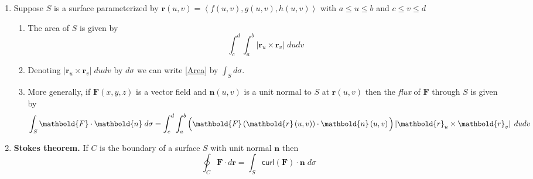 \documentclass[12pt]{article}
\begin{document}
\begin{enumerate}
\item Suppose $S$ is a surface parameterized by
$\mathbold{r}\left(u,v\right)
=\left\langle f\left(u,v\right),g\left(u,v\right),h\left(u,v\right)
\right\rangle$ with $a\le u\le b$ and $c\le v\le d$
\begin{enumerate}
\item The area of $S$ is given by
\begin{equation}\label{Area}
\int_c^d\int_a^b\left|\mathbold{r}_u\times\mathbold{r}_v
\right|\;dudv
\end{equation}
\item Denoting $\left|\mathbold{r}_u\times\mathbold{r}_v\right|\;dudv$
by $d\sigma$ we can write \autoref{Area} by
$\int_Sd\sigma$.
\item More generally, if $\mathbold{F}\left(x,y,z\right)$
is a vector field and $\mathbold{n}\left(u,v\right)$
is a unit normal to $S$ at $\mathbold{r}\left(u,v\right)$
then the {\em flux} of $\mathbold{F}$ through $S$
is given by
\[\int_S\mathbold{F}\cdot\mathbold{n}\;d\sigma
=\int_c^d\int_a^b\left(
\mathbold{F}\left(\mathbold{r}\left(u,v\right)\right)
\cdot\mathbold{n}\left(u,v\right)\rule{0pt}{12pt}\right)
\left|\mathbold{r}_u\times\mathbold{r}_v
\right|\;dudv\]
\end{enumerate}

\item{\bf Stokes theorem.}
If $C$ is the boundary of a surface $S$
with unit normal $\mathbold{n}$ then
\[\oint_C\mathbold{F}\cdot d\mathbold{r}
=\int_S\mathsf{curl}\left(\mathbold{F}\right)
\cdot\mathbold{n}\;d\sigma\]
\end{enumerate}
\end{document}
